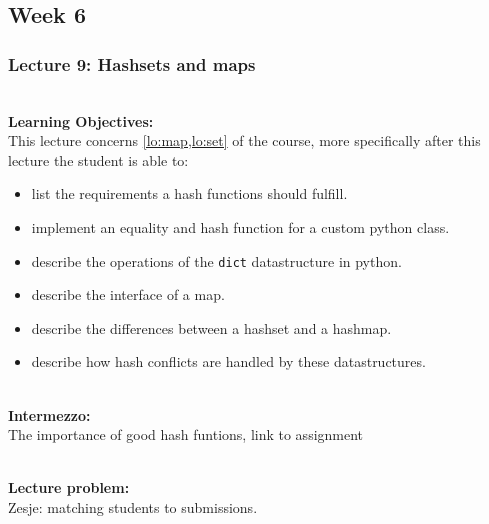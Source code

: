 \subsection{Week 6}
\label{sub:week_6}

\subsubsection{Lecture 9: Hashsets and maps}
\label{sub:lecture_9}

\hfill\\
\textbf{Learning Objectives:}\\
This lecture concerns \cref{lo:map,lo:set} of the course, more specifically after this lecture the student is able
to:
\begin{itemize}
	\item list the requirements a hash functions should fulfill.
	\item implement an equality and hash function for a custom python class.
	\item describe the operations of the \texttt{dict} datastructure in python.
	\item describe the interface of a map.
	\item describe the differences between a hashset and a hashmap.
	\item describe how hash conflicts are handled by these datastructures.
\end{itemize}

\hfill\\
\textbf{Intermezzo:}\\
The importance of good hash funtions, link to assignment

\hfill\\
\textbf{Lecture problem:}\\
Zesje: matching students to submissions.

